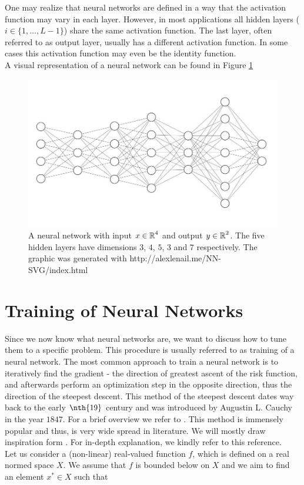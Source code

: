 One may realize that neural networks are defined in a way that the activation function may vary in each layer. However, in most applications all hidden layers ($i \in \{1, \ldots, L-1\}$) share the same activation function. The last layer, often referred to as output layer, usually has a different activation function. In some cases this activation function may even be the identity function.\\
A visual representation of a neural network can be found in Figure \ref{img_nn}


\begin{figure}[H]
\begin{center}
   \begin{minipage}[b]{0.9\linewidth}
      \includegraphics[width=\linewidth]{neural_net}
      \caption{A neural network with input $x\in \operatorname{\mathbb{R}}^4$ and output $y\in\operatorname{\mathbb{R}}^2$. The five hidden layers have dimensions $3$, $4$, $5$, $3$ and $7$ respectively. The graphic was generated with http://alexlenail.me/NN-SVG/index.html}\label{img_nn}
	\end{minipage}
\end{center}
\end{figure}


\section{Training of Neural Networks}\label{sec:training_of_nn}
Since we now know what neural networks are, we want to discuss how to tune them to a specific problem. This procedure is usually referred to as training of a neural network. The most common approach to train a neural network is to iteratively find the gradient - the direction of greatest ascent of the risk function, and afterwards perform an optimization step in the opposite direction, thus the direction of the steepest descent. This method of the steepest descent dates way back to the early $\nth{19}$ century and was introduced by Augustin L. Cauchy in the year $1847$. For a brief overview we refer to \cite{lemarechal2012cauchy}. This method is immensely popular and thus, is very wide spread in literature. We will mostly draw inspiration form \cite[Chapter~XV]{kantorovich2016functional}. For in-depth explanation, we kindly refer to this reference.\\
Let us consider a (non-linear) real-valued function $f$, which is defined on a real normed space $X$. We assume that $f$ is bounded below on $X$ and we aim to find an element $x^{\ast}\in X$ such that


